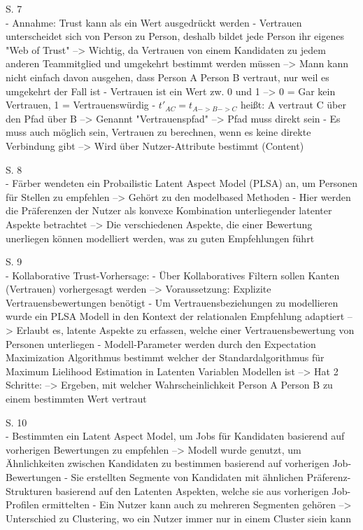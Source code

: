 S. 7\\
- Annahme: Trust kann als ein Wert ausgedrückt werden
- Vertrauen unterscheidet sich von Person zu Person, deshalb bildet jede Person ihr eigenes "Web of Trust" --> Wichtig, da Vertrauen von einem Kandidaten zu jedem anderen Teammitglied und umgekehrt bestimmt werden müssen --> Mann kann nicht einfach davon ausgehen, dass Person A Person B vertraut, nur weil es umgekehrt der Fall ist
- Vertrauen ist ein Wert zw. 0 und 1 --> 0 = Gar kein Vertrauen, 1 = Vertrauenswürdig
- $t'_{AC} = t_{A->B->C}$ heißt: A vertraut C über den Pfad über B --> Genannt "Vertrauenspfad" --> Pfad muss direkt sein
- Es muss auch möglich sein, Vertrauen zu berechnen, wenn es keine direkte Verbindung gibt --> Wird über Nutzer-Attribute bestimmt (Content)

S. 8\\
- Färber wendeten ein Probailistic Latent Aspect Model (PLSA) an, um Personen für Stellen zu empfehlen --> Gehört zu den modelbased Methoden
- Hier werden die Präferenzen der Nutzer als konvexe Kombination unterliegender latenter Aspekte betrachtet --> Die verschiedenen Aspekte, die einer Bewertung unerliegen können modelliert werden, was zu guten Empfehlungen führt

S. 9\\
- Kollaborative Trust-Vorhersage:
- Über Kollaboratives Filtern sollen Kanten (Vertrauen) vorhergesagt werden --> Voraussetzung: Explizite Vertrauensbewertungen benötigt
- Um Vertrauensbeziehungen zu modellieren wurde ein PLSA Modell in den Kontext der relationalen Empfehlung adaptiert --> Erlaubt es, latente Aspekte zu erfassen, welche einer Vertrauensbewertung von Personen unterliegen
- Modell-Parameter werden durch den Expectation Maximization Algorithmus bestimmt welcher der Standardalgorithmus für Maximum Lielihood Estimation in Latenten Variablen Modellen ist --> Hat 2 Schritte: --> Ergeben, mit welcher Wahrscheinlichkeit Person A Person B zu einem bestimmten Wert vertraut

S. 10\\
- Bestimmten ein Latent Aspect Model, um Jobs für Kandidaten basierend auf vorherigen Bewertungen zu empfehlen --> Modell wurde genutzt, um Ähnlichkeiten zwischen Kandidaten zu bestimmen basierend auf vorherigen Job-Bewertungen
- Sie erstellten Segmente von Kandidaten mit ähnlichen Präferenz-Strukturen basierend auf den Latenten Aspekten, welche sie aus vorherigen Job-Profilen ermittelten
- Ein Nutzer kann auch zu mehreren Segmenten gehören --> Unterschied zu Clustering, wo ein Nutzer immer nur in einem Cluster siein kann

